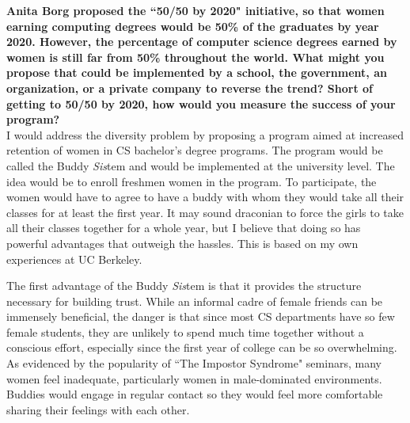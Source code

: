\documentclass{article}
\begin{document}
	
\pagestyle{plain}

\textbf{Anita Borg proposed the ``50/50 by 2020" initiative, so that women earning computing degrees would be 50\% of the graduates by year 2020. However, the percentage of computer science degrees earned by women is still far from 50\% throughout the world.  What might you propose that could be implemented by a school, the government, an organization, or a private company to reverse the trend? Short of getting to 50/50 by 2020, how would you measure the success of your program?}\\

I would address the diversity problem by proposing a program aimed at increased retention of women in CS bachelor's degree programs.
The program would be called the Buddy \textit{Sis}tem and would be implemented at the university level.
The idea would be to enroll freshmen women in the program.
To participate, the women would have to agree to have a buddy with whom they would take all their classes for at least the first year.
It may sound draconian to force the girls to take all their classes together for a whole year, but I believe that doing so has powerful advantages that outweigh the hassles.
This is based on my own experiences at UC Berkeley.

The first advantage of the Buddy \textit{Sis}tem is that it provides the structure necessary for building trust.
While an informal cadre of female friends can be immensely beneficial, the danger is that since most CS departments have so few female students, they are unlikely to spend much time together without a conscious effort, especially since the first year of college can be so overwhelming.
As evidenced by the popularity of ``The Impostor Syndrome" seminars, many women feel inadequate, particularly women in male-dominated environments.
Buddies would engage in regular contact so they would feel more comfortable sharing their feelings with each other.
\end{document}

